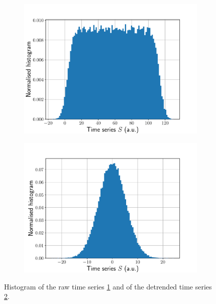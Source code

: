 \documentclass[a4paper,DIV=12,english]{scrartcl}
\begin{document}
\subsection{}
\begin{figure}
    \centering
    \begin{subfigure}{0.49\textwidth}
        \centering
        \includegraphics[width=\textwidth]{../timeseries_hist.pdf}
        \caption{}
        \label{hist}
    \end{subfigure}
    \begin{subfigure}{0.49\textwidth}
        \centering
        \includegraphics[width=\textwidth]{../timeseries_hist_detrended.pdf}
        \caption{}
        \label{hist_detrended}
    \end{subfigure}
    \caption{Histogram of the raw time series \ref{hist} and of the detrended time series \ref{hist_detrended}.}
    \label{fig:hists}
\end{figure}
\end{document}
